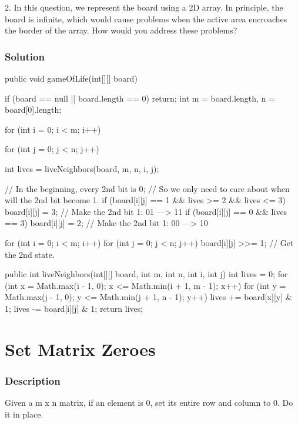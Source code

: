 2. In this question, we represent the board using a 2D array. In principle, the board is infinite, which would cause problems when the active area encroaches the border of the array. How would you address these problems?

\newpage

\subsubsection{Solution}

\begin{Code}
public void gameOfLife(int[][] board) {
    if (board == null || board.length == 0) return;
    int m = board.length, n = board[0].length;

    for (int i = 0; i < m; i++) {
        for (int j = 0; j < n; j++) {
            int lives = liveNeighbors(board, m, n, i, j);

            // In the beginning, every 2nd bit is 0;
            // So we only need to care about when will the 2nd bit become 1.
            if (board[i][j] == 1 && lives >= 2 && lives <= 3) {
                board[i][j] = 3; // Make the 2nd bit 1: 01 ---> 11
            }
            if (board[i][j] == 0 && lives == 3) {
                board[i][j] = 2; // Make the 2nd bit 1: 00 ---> 10
            }
        }
    }

    for (int i = 0; i < m; i++) {
        for (int j = 0; j < n; j++) {
            board[i][j] >>= 1;  // Get the 2nd state.
        }
    }
}

public int liveNeighbors(int[][] board, int m, int n, int i, int j) {
    int lives = 0;
    for (int x = Math.max(i - 1, 0); x <= Math.min(i + 1, m - 1); x++) {
        for (int y = Math.max(j - 1, 0); y <= Math.min(j + 1, n - 1); y++) {
            lives += board[x][y] & 1;
        }
    }
    lives -= board[i][j] & 1;
    return lives;
}
\end{Code}

\newpage

\section{Set Matrix Zeroes} %

\subsubsection{Description}
Given a m x n matrix, if an element is 0, set its entire row and column to 0. Do it in place.

